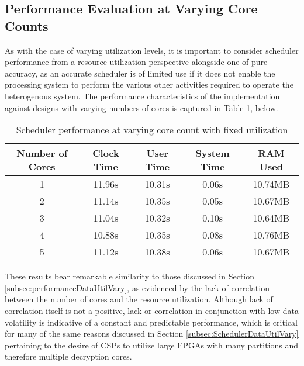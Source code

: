 \subsection{Performance Evaluation at Varying Core Counts}\label{subsec:performanceDataCoresVary}
As with the case of varying utilization levels, it is important to consider scheduler performance from a resource utilization perspective alongside one of pure accuracy, as an accurate scheduler is of limited use if it does not enable the processing system to perform the various other activities required to operate the heterogenous system. The performance characteristics of the implementation against designs with varying numbers of cores is captured in Table \ref{table:SchedPerfCoresVary}, below.

\begin{table}[ht!]
    \centering\begin{tabular}{| c | c | c | c | c |}
        \hline
        Number of Cores & Clock Time & User Time & System Time & RAM Used \\
        \hline
        1 & 11.96s & 10.31s & 0.06s & 10.74MB \\
        2 & 11.14s & 10.35s & 0.05s & 10.67MB \\
        3 & 11.04s & 10.32s & 0.10s & 10.64MB \\
        4 & 10.88s & 10.35s & 0.08s & 10.76MB \\
        5 & 11.12s & 10.38s & 0.06s & 10.67MB \\
        \hline
    \end{tabular}
    \caption{Scheduler performance at varying core count with fixed utilization}
    \label{table:SchedPerfCoresVary}
\end{table}

These results bear remarkable similarity to those discussed in Section \ref{subsec:performanceDataUtilVary}, as evidenced by the lack of correlation between the number of cores and the resource utilization. Although lack of correlation itself is not a positive, lack or correlation in conjunction with low data volatility is indicative of a constant and predictable performance, which is critical for many of the same reasons discussed in Section \ref{subsec:SchedulerDataUtilVary} pertaining to the desire of CSPs to utilize large FPGAs with many partitions and therefore multiple decryption cores.